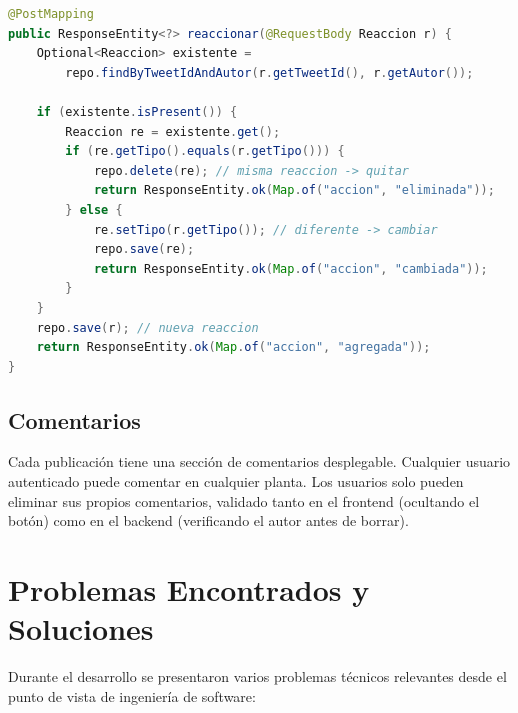 \documentclass[12pt,a4paper]{article}
\begin{document}
\begin{lstlisting}[style=javastyle, language=Java, caption=Lógica de toggle de reacciones]
@PostMapping
public ResponseEntity<?> reaccionar(@RequestBody Reaccion r) {
    Optional<Reaccion> existente =
        repo.findByTweetIdAndAutor(r.getTweetId(), r.getAutor());

    if (existente.isPresent()) {
        Reaccion re = existente.get();
        if (re.getTipo().equals(r.getTipo())) {
            repo.delete(re); // misma reaccion -> quitar
            return ResponseEntity.ok(Map.of("accion", "eliminada"));
        } else {
            re.setTipo(r.getTipo()); // diferente -> cambiar
            repo.save(re);
            return ResponseEntity.ok(Map.of("accion", "cambiada"));
        }
    }
    repo.save(r); // nueva reaccion
    return ResponseEntity.ok(Map.of("accion", "agregada"));
}
\end{lstlisting}

\subsection{Comentarios}

Cada publicación tiene una sección de comentarios desplegable. Cualquier usuario autenticado puede comentar en cualquier planta. Los usuarios solo pueden eliminar sus propios comentarios, validado tanto en el frontend (ocultando el botón) como en el backend (verificando el autor antes de borrar).


\section{Problemas Encontrados y Soluciones}

Durante el desarrollo se presentaron varios problemas técnicos relevantes desde el punto de vista de ingeniería de software:
\end{document}
